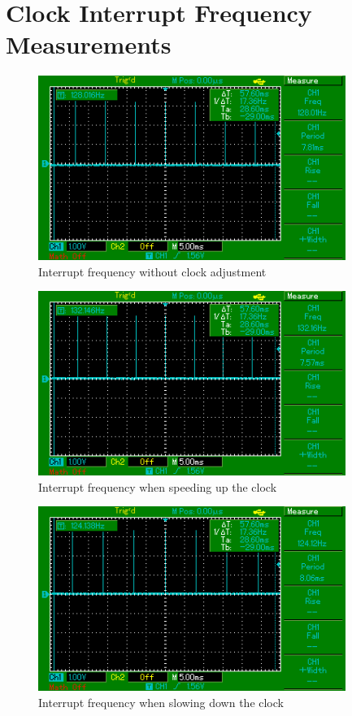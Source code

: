 \chapter{Clock Interrupt Frequency Measurements}\label{app:interrupt-frequency}
\begin{figure}[H]
  \centering
  \includegraphics[width=10cm,keepaspectratio]{fig/osc-no-adjust.png}
  \caption{Interrupt frequency without clock adjustment}
  \label{fig:app-osc-no-adjust}
  \bigskip
\end{figure}

\begin{figure}[H]
  \centering
  \includegraphics[width=10cm,keepaspectratio]{fig/osc-speed-up.png}
  \caption{Interrupt frequency when speeding up the clock}
  \label{fig:app-osc-speed-up}
  \bigskip
\end{figure}

\begin{figure}[H]
  \centering
  \includegraphics[width=10cm,keepaspectratio]{fig/osc-slow-down.png}
  \caption{Interrupt frequency when slowing down the clock}
  \label{fig:app-osc-slow-down}
  \bigskip
\end{figure}


